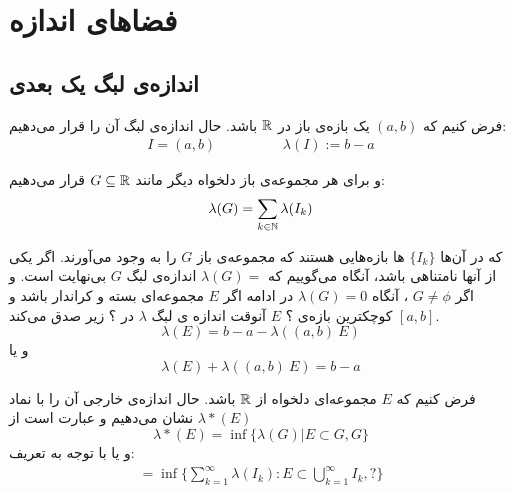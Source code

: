 

\chapter{فضاهای اندازه}



\section{اندازه‌ی لبگ یک بعدی}
 
 فرض کنیم که 
$(a, b)$ 
 یک بازه‌ی باز در 
 ${\mathbb R}$ 
 باشد. حال اندازه‌ی لبگ آن را قرار می‌دهیم:
\begin{align*}
I=(a, b) \hspace{2cm} \lambda(I) := b - a
 \end{align*}
 
 و برای هر مجموعه‌ی باز دلخواه دیگر مانند 
 $ G \subseteq {\mathbb R}$
 قرار می‌دهیم:
 \begin{equation*}
 \lambda(G) = \sum_{k \in {\mathbb N}} \lambda(I_{k}) 
 \end{equation*}
 
 که در آن‌ها 
 $ \lbrace I_k \rbrace $
 ها بازه‌هایی هستند که مجموعه‌ی باز 
 $ G $
 را به وجود می‌آورند. اگر یکی از آنها نامتناهی باشد، آنگاه می‌گوییم که 
 $ \lambda(G) = $
 اندازه‌ی لبگ 
 $ G $
 بی‌نهایت است. و اگر 
 $ G \neq \phi $
، آنگاه 
$ \lambda(G) = 0 $
در ادامه اگر 
$ E $
مجموعه‌ای بسته و کراندار باشد و 
$ [a, b] $
کوچکترین بازه‌ی ؟ 
$ E $
آنوقت اندازه ی لبگ 
$ \lambda $
در ؟ زیر صدق می‌کند.
\begin{equation*}
\lambda(E) = b - a - \lambda ((a, b) \ E ) 
\end{equation*}
و یا
\begin{equation*}
\lambda(E) + \lambda ((a, b) \ E) = b - a 
\end{equation*}

\begin{definition}
فرض کنیم که 
$ E $
مجموعه‌ای دلخواه از 
$ {\mathbb R} $
باشد. حال اندازه‌ی خارجی آن را با نماد 
$ {\lambda}*(E) $
نشان می‌دهیم و عبارت است از 
\begin{equation*}
{\lambda}*(E) = \inf \lbrace \lambda(G) \vert E \subset G , G \rbrace 
\end{equation*}
و یا با توجه به تعریف:
\begin{align}
= \inf \lbrace \sum_{k = 1}^{\infty} \lambda(I_k) : E \subset \bigcup_{k = 1}^{\infty} I_k , ? \rbrace \nonumber
\end{align}
\end{definition}

